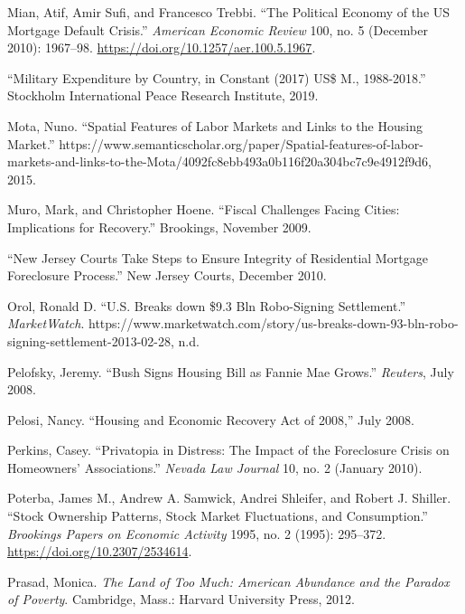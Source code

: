\documentclass[12pt,oneside]{psthesis}
\begin{document}
\leavevmode\hypertarget{ref-mianPoliticalEconomyUS2010}{}%
Mian, Atif, Amir Sufi, and Francesco Trebbi. ``The Political Economy of the US Mortgage Default Crisis.'' \emph{American Economic Review} 100, no. 5 (December 2010): 1967--98. \url{https://doi.org/10.1257/aer.100.5.1967}.

\leavevmode\hypertarget{ref-2019military}{}%
``Military Expenditure by Country, in Constant (2017) US\$ M., 1988-2018.'' Stockholm International Peace Research Institute, 2019.

\leavevmode\hypertarget{ref-mota2015spatial}{}%
Mota, Nuno. ``Spatial Features of Labor Markets and Links to the Housing Market.'' https://www.semanticscholar.org/paper/Spatial-features-of-labor-markets-and-links-to-the-Mota/4092fc8ebb493a0b116f20a304bc7c9e4912f9d6, 2015.

\leavevmode\hypertarget{ref-muro2009fiscal}{}%
Muro, Mark, and Christopher Hoene. ``Fiscal Challenges Facing Cities: Implications for Recovery.'' Brookings, November 2009.

\leavevmode\hypertarget{ref-comfort2010new}{}%
``New Jersey Courts Take Steps to Ensure Integrity of Residential Mortgage Foreclosure Process.'' New Jersey Courts, December 2010.

\leavevmode\hypertarget{ref-orolbreaks}{}%
Orol, Ronald D. ``U.S. Breaks down \$9.3 Bln Robo-Signing Settlement.'' \emph{MarketWatch}. https://www.marketwatch.com/story/us-breaks-down-93-bln-robo-signing-settlement-2013-02-28, n.d.

\leavevmode\hypertarget{ref-pelofsky2008bush}{}%
Pelofsky, Jeremy. ``Bush Signs Housing Bill as Fannie Mae Grows.'' \emph{Reuters}, July 2008.

\leavevmode\hypertarget{ref-pelosi2008housing}{}%
Pelosi, Nancy. ``Housing and Economic Recovery Act of 2008,'' July 2008.

\leavevmode\hypertarget{ref-perkins2010privatopia}{}%
Perkins, Casey. ``Privatopia in Distress: The Impact of the Foreclosure Crisis on Homeowners' Associations.'' \emph{Nevada Law Journal} 10, no. 2 (January 2010).

\leavevmode\hypertarget{ref-poterba1995stock}{}%
Poterba, James M., Andrew A. Samwick, Andrei Shleifer, and Robert J. Shiller. ``Stock Ownership Patterns, Stock Market Fluctuations, and Consumption.'' \emph{Brookings Papers on Economic Activity} 1995, no. 2 (1995): 295--372. \url{https://doi.org/10.2307/2534614}.

\leavevmode\hypertarget{ref-prasad2012land}{}%
Prasad, Monica. \emph{The Land of Too Much: American Abundance and the Paradox of Poverty}. Cambridge, Mass.: Harvard University Press, 2012.
\end{document}
